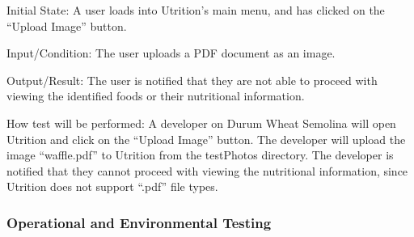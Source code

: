 \documentclass[12pt, titlepage]{article}
\begin{document}
\begin{enumerate}
		Initial State: A user loads into Utrition’s main menu, and has clicked on the “Upload Image” button.
		
		Input/Condition: The user uploads a PDF document as an image.
		
		Output/Result: The user is notified that they are not able to proceed with viewing the identified foods or their nutritional information.
		
		How test will be performed: A developer on Durum Wheat Semolina will open Utrition and click on the “Upload Image” button. The developer will upload the image “waffle.pdf” to Utrition from the testPhotos directory. The developer is notified that they cannot proceed with viewing the nutritional information, since Utrition does not support “.pdf” file types.
		
	\end{enumerate}
	
	\subsubsection{Operational and Environmental Testing}
	
	
\end{document}
